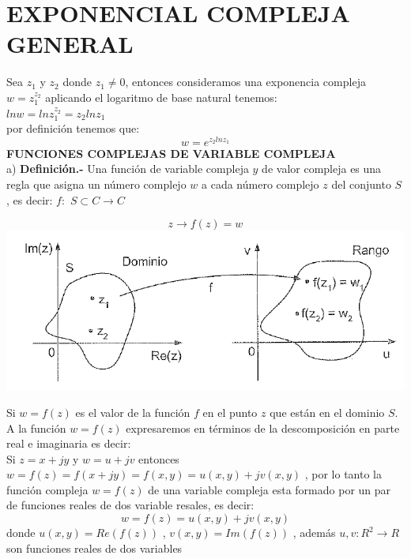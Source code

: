 \documentclass[10pt,a4paper]{book}
\begin{document}
\section{EXPONENCIAL COMPLEJA GENERAL}
Sea $z_1$ y $z_2$ donde $z_1 \neq 0$, entonces consideramos una exponencia compleja $w = z_1^{z_2}$ aplicando el logaritmo de base natural tenemos:
 \\ $ln w = ln z_1^{z_2} = z_2 ln z_1$
 \\ por definición tenemos que: \begin{equation}
 w = e^{z_2 ln z_1}
\end{equation}  
 \textbf{FUNCIONES COMPLEJAS DE VARIABLE COMPLEJA}
 \\ a) \textbf{Definición.-} Una función de variable compleja $y$ de valor compleja es una regla que asigna un número complejo $w$ a cada número complejo $z$ del conjunto $S$, es decir: $f:$ $S\subset C \rightarrow C$
 \begin{center}
	\begin{equation}
	z \rightarrow f(z)=w
    \end{equation}	   
   \includegraphics[scale=0.8]{Funcion.png}  
  \end{center}  
 Si $w =f(z)$ es el valor de la función $f$ en el punto $z$ que están en el dominio $S$. 
 \\ A la función $w=f(z)$ expresaremos en términos de la descomposición en parte real e imaginaria es decir:
 \\ Si $z= x + jy$ y $w = u +jv$ entonces $w =f(z)=f(x+jy)=f(x,y)=u(x,y)+jv(x,y)$ , por lo tanto la función compleja $w=f(z)$ de una variable compleja esta formado por un par de funciones reales de dos variable resales, es decir:
  \begin{equation}
   w = f(z) = u(x,y) + jv(x,y) 
  \end{equation}
  donde $u(x,y) = Re(f(z))$ , $v(x,y)=Im(f(z))$ , además $u,v: R^{2} \rightarrow R $ son funciones reales de dos variables
  \\
\end{document}
